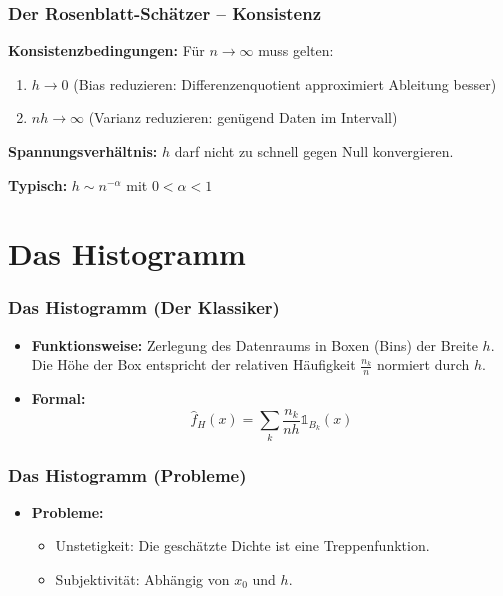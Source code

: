 \documentclass{beamer}
\begin{document}
	\begin{frame}
		\frametitle{Der Rosenblatt-Schätzer – Konsistenz}
		
		\textbf{Konsistenzbedingungen:} Für $n \to \infty$ muss gelten:
		\begin{enumerate}
			\item $h \to 0$ \quad (Bias reduzieren: Differenzenquotient approximiert Ableitung besser)
			\item $nh \to \infty$ \quad (Varianz reduzieren: genügend Daten im Intervall)
		\end{enumerate}
		
		\vspace{0.5cm}
		
		\textbf{Spannungsverhältnis:} $h$ darf nicht zu schnell gegen Null konvergieren.
		
		\textbf{Typisch:} $h \sim n^{-\alpha}$ mit $0 < \alpha < 1$
	\end{frame}
	
	\section{Das Histogramm}
	
	\begin{frame}
		\frametitle{Das Histogramm (Der Klassiker)}
		
		\begin{itemize}
			\item \textbf{Funktionsweise:} Zerlegung des Datenraums in Boxen (Bins) der Breite $h$. Die Höhe der Box entspricht der relativen Häufigkeit $\frac{n_k}{n}$ normiert durch $h$.
			\item \textbf{Formal:}
			\[
			\hat f_H(x) = \sum_k \frac{n_k}{nh}\mathds{1}_{B_k}(x)
			\]
		\end{itemize}
	\end{frame}
	
	\begin{frame}
		\frametitle{Das Histogramm (Probleme)}
		\begin{itemize}
			\item \textbf{Probleme:}
			\begin{itemize} %
				\item Unstetigkeit: Die geschätzte Dichte ist eine Treppenfunktion.
				\item Subjektivität: Abhängig von $x_0$ und $h$.
			\end{itemize}
		\end{itemize}
	\end{frame}
	
\end{document}
